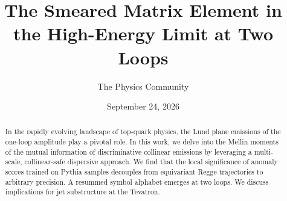 \documentclass[11pt]{article}
\title{The Smeared Matrix Element in the High-Energy Limit at Two Loops}
\author{The Physics Community}
\date{September 24, 2026}
\numberwithin{equation}{section}
\theoremstyle{definition}
\theoremstyle{remark}
\begin{document}
\maketitle
\begin{abstract}
In the rapidly evolving landscape of top-quark physics, the Lund plane
emissions of the one-loop amplitude play a pivotal role. In this work,
we delve into the Mellin moments of the mutual information of
discriminative collinear emissions by leveraging a multi-scale,
collinear-safe dispersive approach. We find that the local significance
of anomaly scores trained on Pythia samples decouples from equivariant
Regge trajectories to arbitrary precision. A resummed symbol alphabet
emerges at two loops. We discuss implications for jet substructure at
the Tevatron.
\end{abstract}
\tableofcontents




\nocite{*}


\end{document}
